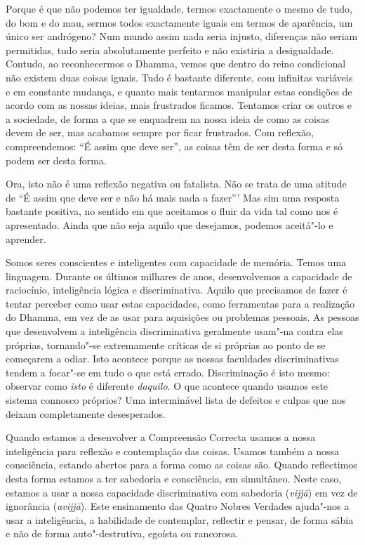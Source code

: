 Porque é que não podemos ter igualdade, termos exactamente o mesmo de tudo, do
bom e do mau, sermos todos exactamente iguais em termos de aparência, um único
ser andrógeno? Num mundo assim nada seria injusto, diferenças não seriam
permitidas, tudo seria absolutamente perfeito e não existiria a desigualdade.
Contudo, ao reconhecermos o Dhamma, vemos que dentro do reino condicional não
existem duas coisas iguais. Tudo é bastante diferente, com infinitas variáveis e
em constante mudança, e quanto mais tentarmos manipular estas condições de
acordo com as nossas ideias, mais frustrados ficamos. Tentamos criar os outros e
a sociedade, de forma a que se enquadrem na nossa ideia de como as coisas devem
de ser, mas acabamos sempre por ficar frustrados. Com reflexão, compreendemos:
“É assim que deve ser”, as coisas têm de ser desta forma e só podem ser desta
forma.

Ora, isto não é uma reflexão negativa ou fatalista. Não se trata de uma atitude
de “É assim que deve ser e não há mais nada a fazer”' Mas sim uma resposta
bastante positiva, no sentido em que aceitamos o fluir da vida tal como nos é
apresentado. Ainda que não seja aquilo que desejamos, podemos aceitá"-lo e
aprender.

\sectionBreak

Somos seres conscientes e inteligentes com capacidade de memória. Temos uma
linguagem. Durante os últimos milhares de anos, desenvolvemos a capacidade de
raciocínio, inteligência lógica e discriminativa. Aquilo que precisamos de fazer
é tentar perceber como usar estas capacidades, como ferramentas para a
realização do Dhamma, em vez de as usar para aquisições ou problemas pessoais.
As pessoas que desenvolvem a inteligência discriminativa geralmente usam"-na
contra elas próprias, tornando"-se extremamente críticas de si próprias ao ponto
de se começarem a odiar. Isto acontece porque as nossas faculdades
discriminativas tendem a focar"-se em tudo o que está errado. Discriminação é
isto mesmo: observar como \emph{isto} é diferente \emph{daquilo}. O que acontece
quando usamos este sistema connosco próprios? Uma interminável lista de defeitos
e culpas que nos deixam completamente desesperados.

Quando estamos a desenvolver a Compreensão Correcta usamos a nossa inteligência
para reflexão e contemplação das coisas. Usamos também a nossa consciência,
estando abertos para a forma como as coisas são. Quando reflectimos desta forma
estamos a ter sabedoria e consciência, em simultâneo. Neste caso, estamos a
usar a nossa capacidade discriminativa com sabedoria (\emph{vijjā}) em vez de
ignorância (\emph{avijjā}). Este ensinamento das Quatro Nobres Verdades ajuda"-nos 
a usar a inteligência, a habilidade de contemplar, reflectir e
pensar, de forma sábia e não de forma auto"-destrutiva, egoísta ou rancorosa.

